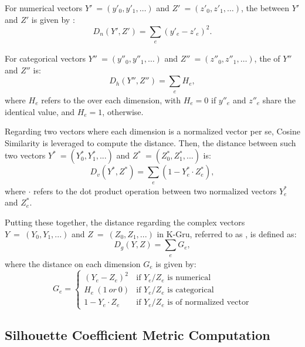 For numerical vectors $Y'\ = (y'_0, y'_1, \ldots)$ and $Z'\ = (z'_0, z'_1, \ldots)$, the \od{} \cite{IEEEexample:books/mk/HanKP2011} between $Y'$ and $Z'$ is given by :
%
\begin{equation}
\label{eq:od}
D_n(Y', Z') = \sum_{\substack{e}} (y'_e - z'_e)^2.
\end{equation}

For categorical vectors $Y''\ = (y''_0, y''_1, \ldots)$ and  $Z''\ = (z''_0, z''_1, \ldots)$, the \hd{} \cite{IEEEexample:huang1997clustering} of $Y''$ and $Z''$ is:
%
\begin{equation}
\label{eq:hd}
D_h(Y'', Z'') = \sum_{\substack{e}} H_e,
\end{equation}
where $H_e$ refers to the \hd{} over each dimension, with $H_e = 0$ if $y''_e$ and $z''_e$ share the identical value, and $H_e = 1$, otherwise.

Regarding two vectors where each dimension is a normalized vector per se, Cosine Similarity is leveraged to compute the distance.
Then, the distance between such two vectors $Y^{\ast}\ = (Y^{\ast}_0, Y^{\ast}_1, ...)$ and $Z^{\ast}\ = (Z^{\ast}_0, Z^{\ast}_1, ...)$ is:
%
\begin{equation}
\label{eq:vd}
D_v(Y^{\ast}, Z^{\ast}) = \sum_{\substack{e}} (1- Y^{\ast}_e \cdot Z^{\ast}_e),
\end{equation}
where $\cdot$ refers to the dot product operation between two normalized vectors $Y^{\ast}_e$ and $Z^{\ast}_e$.

Putting these together, the distance regarding the complex vectors $Y\ =\ (Y_0, Y_1, ...)$ and $Z\ =\ (Z_0, Z_1, ...)$ in K-Gru, referred to as \gd{}, is defined as:
%
\begin{equation}
\label{eq:gd}
D_g(Y, Z) = \sum_{\substack{e}} G_e,
\end{equation}
where the distance on each dimension $G_e$ is given by:
%
\begin{equation}
\label{eq:ge}
G_e =
  \begin{cases}
    (Y_e - Z_e)^2       &  \text{if } Y_e/Z_e \text{ is numerical}\\
    H_e\ (1\ or\ 0)       	&  \text{if } Y_e/Z_e \text{ is categorical}\\
    1 - Y_e \cdot Z_e  		&  \text{if } Y_e/Z_e \text{ is of normalized vector}
  \end{cases}
\end{equation}


\subsection{Silhouette Coefficient Metric Computation}
\label{sec:compu}

